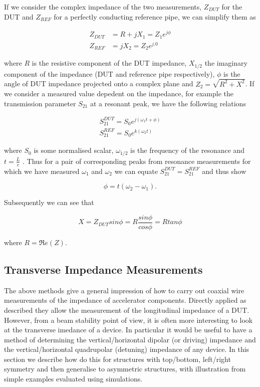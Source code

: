 \documentclass[12pt,a4paper,twopage,openright]{article}
\begin{document}
If we consider the complex impedance of the two measurements, $Z_{DUT}$ for the DUT and $Z_{REF}$ for a perfectly conducting reference pipe, we can simplify them as

\begin{align}
Z_{DUT} & =  R + jX_{1}  =  Z_{1}e^{j \phi} \\
Z_{REF} & =  jX_{2}  =  Z_{2}e^{j.0}
\end{align}

where $R$ is the resistive component of the DUT impedance, $X_{1/2}$ the imaginary component of the impedance (DUT and reference pipe respectively), $\phi$ is the angle of DUT impedance projected onto a complex plane and $Z_{2} = \sqrt{R^{2} + X^{2}}$. If we consider a measured value depedent on the impedance, for example the transmission parameter $S_{21}$ at a resonant peak, we have the following relations

\begin{align}
S_{21}^{DUT} = S_{0}e^{j \left( \omega_{1}t + \phi \right)} \\
S_{21}^{REF} = S_{0}e^{k \left( \omega_{2}t \right)}
\end{align}

where $S_{0}$ is some normalised scalar, $\omega_{1/2}$ is the frequency of the resonance and $t = \frac{L}{c}$ . Thus for a pair of corresponding peaks from resonance measurements for which we have measured $\omega_{1}$ and $\omega_{2}$ we can equate $S_{21}^{DUT} = S_{21}^{REF}$ and thus show

\begin{equation}
\phi = t \left( \omega_{2} - \omega_{1} \right).
\end{equation}

Subsequently we can see that

\begin{equation}
X = Z_{DUT} sin \phi = R \frac {sin \phi}{cos \phi} = R tan \phi
\end{equation}

where $R = \Re e(Z)$.

\subsection{Transverse Impedance Measurements}

The above methods give a general impression of how to carry out coaxial wire measurements of the impedance of accelerator components. Directly applied as described they allow the measurement of the longitudinal impedance of a DUT. However, from a beam stability point of view, it is often more interesting to look at the transverse imedance of a device. In particular it would be useful to have a method of determining the vertical/horizontal dipolar (or driving) impedance and the vertical/horizontal quadrupolar (detuning) impedance of any device. In this section we describe how do this for structures with top/bottom, left/right symmetry and then generalise to asymmetric structures, with illustration from simple examples evaluated using simulations.
\end{document}
